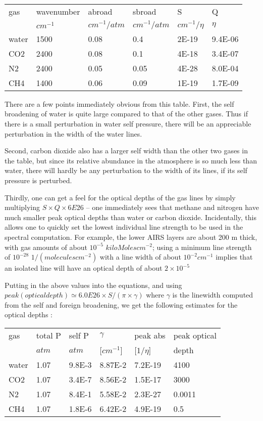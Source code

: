 \documentclass[11pt]{article}
\begin{document}
\begin{longtable}{llllll} 
gas & wavenumber & abroad         & sbroad       & S & Q  \\
    & $cm^{-1}$  & $cm^{-1}/atm$ & $cm^{-1}/atm$ &$cm^{-1}/\eta$ & $\eta$ \\ 
\hline
water & 1500 & 0.08 & 0.4  & 2E-19 & 9.4E-06 \\
CO2   & 2400 & 0.08 & 0.1  & 4E-18 & 3.4E-07 \\
N2    & 2400 & 0.05 & 0.05 & 4E-28 & 8.0E-04 \\
CH4   & 1400 & 0.06 & 0.09 & 1E-19 & 1.7E-09 \\
\hline
\end{longtable} 
 
There are a few points immediately obvious from this table. First, the 
self broadening of water is quite large compared to that of the other 
gases. Thus if there is a small perturbation in water self pressure, there 
will be an appreciable perturbation in the width of the water lines. 

Second, carbon dioxide also has a larger self width than the other two gases
in the table, but since its relative abundance in the atmosphere is so much
less than water, there will hardly be any perturbation to the width of
its lines, if its self pressure is perturbed. 

Thirdly, one can get a feel 
for the optical depths of the gas lines by simply multiplying $S \times Q
\times 6E26$ -- one immediately sees that methane and nitrogen have much 
smaller peak optical depths than water or carbon dioxide. Incidentally, 
this allows one to quickly set the lowest individual line strength to be 
used in the spectral computation. For example, the lower AIRS layers are 
about  200 m thick, with gas amounts of about $10^{-5}$ 
$kiloMolescm^{-2}$; using a minimum line strength of $10^{-28}$ 
$1/(moleculescm^{-2})$ with a line width of about $10^{-2} cm^{-1}$ 
implies that an isolated line will have an optical depth of about
$2 \times 10^{-5}$ 

Putting in the above values into the equations, and 
using $peak(optical depth) \simeq 6.0E26 \times S/(\pi \times \gamma)$ 
where $\gamma$ is the linewidth computed from the self and foreign 
broadening, we get the following estimates for the optical depths : 

\begin{longtable}{llllll} 
gas & total P & self P & $\gamma$   & peak abs   & peak optical \\
    & $atm$   & $atm$  & [$cm^{-1}$] & [$1/\eta$] & depth \\
\hline
water & 1.07 & 9.8E-3 & 8.87E-2 & 7.2E-19 & 4100 \\
CO2   & 1.07 & 3.4E-7 & 8.56E-2 & 1.5E-17 & 3000 \\
N2    & 1.07 & 8.4E-1 & 5.58E-2 & 2.3E-27 & 0.0011\\
CH4   & 1.07 & 1.8E-6 & 6.42E-2 & 4.9E-19 & 0.5\\
\hline 
\end{longtable} 
 
\end{document}
